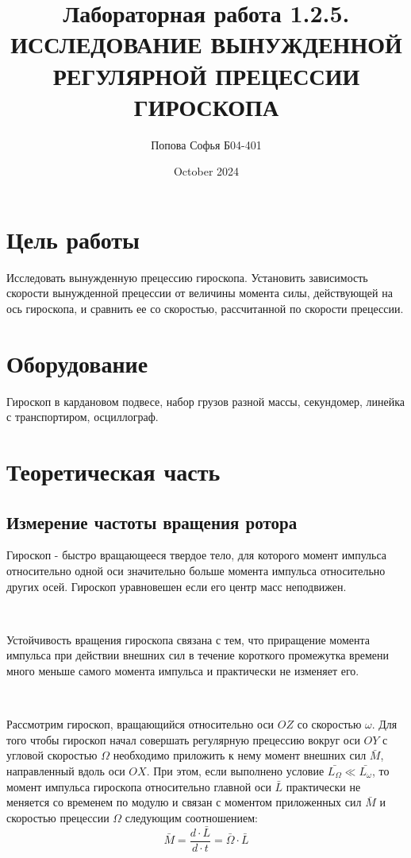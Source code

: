 \documentclass{article}
\title{\textbf{Лабораторная работа 1.2.5.} \linebreak
ИССЛЕДОВАНИЕ ВЫНУЖДЕННОЙ РЕГУЛЯРНОЙ ПРЕЦЕССИИ ГИРОСКОПА}
\author{Попова Софья Б04-401}
\date{October 2024}
\begin{document}
\maketitle

\section*{Цель работы}
Исследовать вынужденную прецессию гироскопа. Установить зависимость скорости вынужденной прецессии от величины момента силы, действующей на ось гироскопа, и сравнить ее со скоростью, рассчитанной по скорости прецессии.

\section*{Оборудование}
Гироскоп в кардановом подвесе, набор грузов разной массы, секундомер, линейка с транспортиром, осциллограф.

\section*{Теоретическая часть}

\subsection*{Измерение частоты вращения ротора}
Гироскоп - быстро вращающееся твердое тело, для которого момент импульса относительно одной оси значительно больше момента импульса относительно других осей. Гироскоп уравновешен если его центр масс неподвижен.

\

\noindent
Устойчивость вращения гироскопа связана с тем, что приращение момента импульса при действии внешних сил в течение короткого промежутка времени много меньше самого момента импульса и практически не изменяет его.

\

\noindent
Рассмотрим гироскоп, вращающийся относительно оси $OZ$ со скоростью $\omega$. Для того чтобы гироскоп начал совершать регулярную прецессию вокруг оси $OY$ с угловой скоростью $\Omega$ необходимо приложить к нему момент внешних сил $\bar{M}$, направленный вдоль оси $OX$. При этом, если выполнено условие $\bar{L_{\Omega}} \ll \bar{L_{\omega}}$, то момент импульса гироскопа относительно главной оси $\bar{L}$ практически не меняется со временем по модулю и связан с моментом приложенных сил $\bar{M}$ и скоростью прецессии $\Omega$ следующим соотношением:
\begin{equation}
    \bar{M} = \frac{d\cdot\bar{L}}{d\cdot t} = \bar{\Omega}\cdot\bar{L}
\end{equation}
\end{document}
